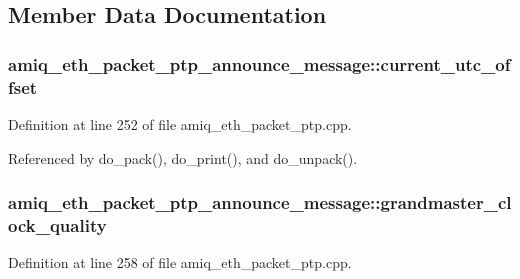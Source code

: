 \subsection{Member Data Documentation}
\hypertarget{classamiq__eth__packet__ptp__announce__message_aa0d05c2c4d2e45e899dd2e2d921c790a}{
\subsubsection[{current\_\-utc\_\-offset}]{ {\bf amiq\_\-eth\_\-packet\_\-ptp\_\-announce\_\-message::current\_\-utc\_\-offset}}}
\label{classamiq__eth__packet__ptp__announce__message_aa0d05c2c4d2e45e899dd2e2d921c790a}


Definition at line 252 of file amiq\_\-eth\_\-packet\_\-ptp.cpp.

Referenced by do\_\-pack(), do\_\-print(), and do\_\-unpack().\hypertarget{classamiq__eth__packet__ptp__announce__message_a866b981ee7e7f2676da3489c03471ce3}{
\subsubsection[{grandmaster\_\-clock\_\-quality}]{ {\bf amiq\_\-eth\_\-packet\_\-ptp\_\-announce\_\-message::grandmaster\_\-clock\_\-quality}}}
\label{classamiq__eth__packet__ptp__announce__message_a866b981ee7e7f2676da3489c03471ce3}


Definition at line 258 of file amiq\_\-eth\_\-packet\_\-ptp.cpp.

